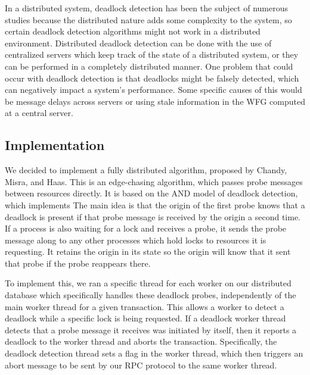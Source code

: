 \documentclass[a4paper, 10pt, notitlepage]{article}
\begin{document}
In a distributed system, deadlock detection has been the subject of numerous studies because the distributed nature adds some complexity to the system, so certain deadlock detection algorithms might not work in a distributed environment. Distributed deadlock detection can be done with the use of centralized servers which keep track of the state of a distributed system, or they can be performed in a completely distributed manner. One problem that could occur with deadlock detection is that deadlocks might be falsely detected, which can negatively impact a system's performance. Some specific causes of this would be message delays across servers or using stale information in the WFG computed at a central server.

\subsection{Implementation}
We decided to implement a fully distributed algorithm, proposed by Chandy, Misra, and Haas. This is an edge-chasing algorithm, which passes probe messages between resources directly. It is based on the AND model of deadlock detection, which implements The main idea is that the origin of the first probe knows that a deadlock is present if that probe message is received by the origin a second time. If a process is also waiting for a lock and receives a probe, it sends the probe message along to any other processes which hold locks to resources it is requesting. It retains the origin in its state so the origin will know that it sent that probe if the probe reappears there.

To implement this, we ran a specific thread for each worker on our distributed database which specifically handles these deadlock probes, independently of the main worker thread for a given transaction. This allows a worker to detect a deadlock while a specific lock is being requested. If a deadlock worker thread detects that a probe message it receives was initiated by itself, then it reports a deadlock to the worker thread and aborts the transaction. Specifically, the deadlock detection thread sets a flag in the worker thread, which then triggers an abort message to be sent by our RPC protocol to the same worker thread.
\end{document}
